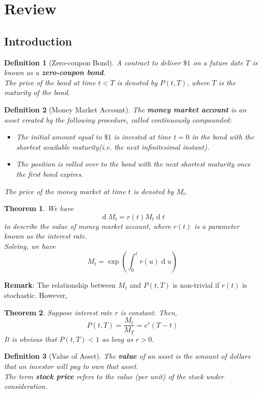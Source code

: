 \documentclass[12pt]{article}
\newtheorem{definition}{Definition}[section]
\newtheorem{theorem}{Theorem}[section]
\theoremstyle{definition}
\DeclareMathOperator{\diff}{d}
\begin{document}
\twocolumn
\section{Review}
\subsection{Introduction}
\begin{definition}[Zero-coupon Bond]
\normalfont A contract to deliver $\$1$ on a future date $T$ is known as a \textbf{zero-coupon bond}.\\
The price of the bond at time $t<T$ is denoted by $P(t,T)$, where $T$ is the maturity of the bond.
\end{definition}
\begin{definition}[Money Market Account]
\normalfont The \textbf{money market account} is an asset created by the following procedure, called continuously compounded:
\begin{itemize}
  \item The initial amount equal to $\$1$ is invested at time $t=0$ in the bond with the shortest available maturity(i.e. the next infinitesimal instant).
  \item The position is rolled over to the bond with the next shortest maturity once the first bond expires.
\end{itemize}
The price of the money market at time $t$ is denoted by $M_t$.
\end{definition}
\begin{theorem}
\normalfont We have
\[
\diff M_t = r(t)M_t\diff t
\]
to describe the value of money market account, where $r(t)$ is a parameter known as the interest rate.\\
Solving, we have
\[
M_t = \exp\left(\int_0^t r(u)\diff u\right)
\]
\end{theorem}
\textbf{Remark}: The relationship between $M_t$ and $P(t,T)$ is non-trivial if $r(t)$ is stochastic. However, 
\begin{theorem}
\normalfont Suppose interest rate $r$ is constant. Then, 
\[
P(t,T)=\frac{M_t}{M_T} = e^r(T-t)
\]
It is obvious that $P(t,T)<1$ as long as $r>0$.
\end{theorem}
\begin{definition}[Value of Asset]
\normalfont The \textbf{value} of an asset is the amount of dollars that an investor will pay to own that asset.\\
The term \textbf{stock price} refers to the value (per unit) of the stock under consideration.
\end{definition}
\end{document}
